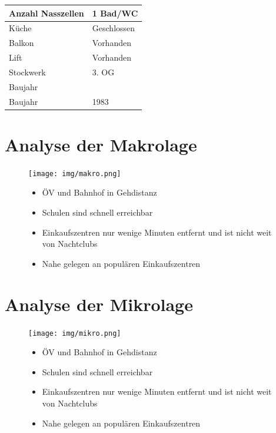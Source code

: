 \documentclass{article}
\begin{document}
\begin{flushleft}
\begin{tabular}{ |l|l| }
			Anzahl Nasszellen & \cellcolor{lightgray} 1 Bad/WC \\ 
			\hline
			Küche & \cellcolor{lightgray} Geschlossen \\ 
			\hline
			Balkon & \cellcolor{lightgray} Vorhanden \\ 
			\hline
			Lift & \cellcolor{lightgray} Vorhanden \\ 
			\hline
			Stockwerk & \cellcolor{lightgray} 3. OG \\ 
			\hline
			\rowcolor{gray} Baujahr & \\
			\hline
			Baujahr & \cellcolor{lightgray} 1983 \\ 
			\hline
		\end{tabular}
	\end{flushleft}
	
	\clearpage
	\section{Analyse der Makrolage}
	
	\begin{figure}[!htbp]
		\begin{minipage}[c]{0.67\textwidth}
			\texttt{[image: img/makro.png]}
		\end{minipage}\hfill
		\begin{minipage}[c]{0.3\textwidth}
			\begin{itemize}
				\item ÖV und Bahnhof in Gehdistanz
				\item Schulen sind schnell erreichbar
				\item Einkaufszentren nur wenige Minuten entfernt und ist nicht weit von Nachtclubs
				\item Nahe gelegen an populären Einkaufszentren
			\end{itemize}
		\end{minipage}
	\end{figure}

	\clearpage
	\section{Analyse der Mikrolage}
	
	\begin{figure}[!htbp]
		\begin{minipage}[c]{0.67\textwidth}
			\texttt{[image: img/mikro.png]}
		\end{minipage}\hfill
		\begin{minipage}[c]{0.3\textwidth}
			\begin{itemize}
				\item ÖV und Bahnhof in Gehdistanz
				\item Schulen sind schnell erreichbar
				\item Einkaufszentren nur wenige Minuten entfernt und ist nicht weit von Nachtclubs
				\item Nahe gelegen an populären Einkaufszentren
			\end{itemize}
		\end{minipage}
	\end{figure}
\end{document}
